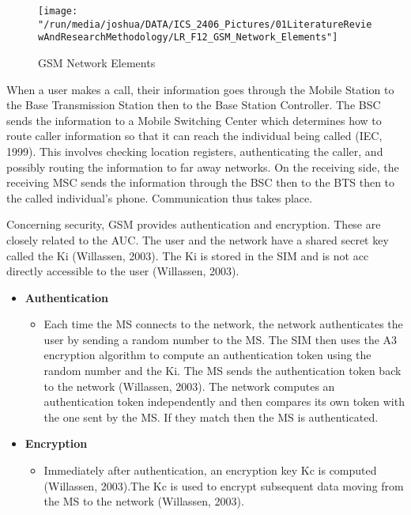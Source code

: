 \documentclass[12pt,svgnames,smaller]{article} %
\begin{document}
	\begin{figure}
		\centering
		\texttt{[image: "/run/media/joshua/DATA/ICS\_2406\_Pictures/01LiteratureReviewAndResearchMethodology/LR\_F12\_GSM\_Network\_Elements"]}
		\caption{GSM Network Elements}				\label{fig:LiteratureReview-Figure12}
	\end{figure}
	
	When a user makes a call, their information goes through the Mobile Station to the Base Transmission Station then to the Base Station Controller. The BSC sends the information to a Mobile Switching Center which determines how to route caller information so that it can reach the individual being called (IEC, 1999). This involves checking location registers, authenticating the caller, and possibly routing the information to far away networks. On the receiving side, the receiving MSC sends the information through the BSC then to the BTS then to the called individual’s phone. Communication thus takes place.
	
	Concerning security, GSM provides authentication and encryption. These are closely related to the AUC. The user and the network have a shared secret key called the Ki (Willassen, 2003). The Ki is stored in the SIM and is not acc directly accessible to the user (Willassen, 2003).
	
	\begin{itemize}
		
		\item \textbf{Authentication} 
		
		\begin{itemize}
			\item Each time the MS connects to the network, the network authenticates the user by sending a random number to the MS. The SIM then uses the A3 encryption algorithm to compute an authentication token using the random number and the Ki. The MS sends the authentication token back to the network (Willassen, 2003). The network computes an authentication token independently and then compares its own token with the one sent by the MS. If they match then the MS is authenticated. 
		\end{itemize}
		
		
		\item \textbf{Encryption}
		
		\begin{itemize}
			\item Immediately after authentication, an encryption key Kc is computed (Willassen, 2003).The Kc is used to encrypt subsequent data moving from the MS to the network (Willassen, 2003).
		\end{itemize}
		
		
	\end{itemize}
	
\end{document}
